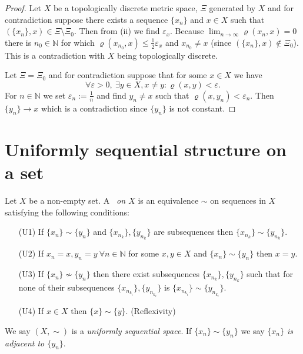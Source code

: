 \begin{proof}
Let $X$ be a topologically discrete metric space, $\Xi$ generated by $X$ and for contradiction suppose there exists a sequence $\{x_n\}$ and $x\in X$ such that $(\{x_n\},x)\in\Xi\setminus\Xi_0$. Then from (ii) we find $\varepsilon_x$. Because $\lim_{n\to\infty}\varrho(x_n,x)=0$ there is $n_0\in\mathbb{N}$ for which $\varrho(x_{n_0},x)\le\frac{1}{2}\varepsilon_x$ and $x_{n_0}\ne x$ (since $(\{x_n\},x)\notin\Xi_0$). This is a contradiction with $X$ being topologically discrete.

Let $\Xi=\Xi_0$ and for contradiction suppose that for some $x\in X$ we have
\[
	\forall \varepsilon>0,\ \exists y\in X, x\ne y: \varrho(x,y)<\varepsilon.
\]
For $n\in \mathbb{N}$ we set $\varepsilon_n:=\frac{1}{n}$ and find $y_n\ne x$ such that $\varrho(x,y_n)<\varepsilon_n$. Then $\{y_n\}\to x$ which is a contradiction since $\{y_n\}$ is not constant.
\end{proof}

\section{Uniformly sequential structure on a set}



\begin{define} \label{def:unistr}
Let $X$ be a non-empty set.  A \emph{\uss\ on $X$} is an equivalence $\sim$ on sequences in $X$ satisfying the following conditions:
\begin{enumerate}
	\item[(U1)] If $\{x_n\} \sim \{y_n\}$ and $\{x_{n_k}\}, \{y_{n_k}\}$ are subsequences then $\{x_{n_k}\} \sim \{y_{n_k}\}$.
	\item[(U2)] If $x_n=x, y_n=y\ \forall n\in \mathbb{N}$ for some $x,y\in X$ and $\{x_n\} \sim \{y_n\}$ then $x=y$.
	\item[(U3)] If $\{x_n\} \not\sim \{y_n\}$ then there exist subsequences $\{x_{n_k}\}, \{y_{n_k}\}$ such that for none of their subsequences $\{x_{n_{k_i}}\}, \{y_{n_{k_i}}\}$ is $\{x_{n_{k_i}}\}\sim \{y_{n_{k_i}}\}$.
	\item[(U4)] If $x\in X$ then $\{x\} \sim \{y\}$. (Reflexivity) 
\end{enumerate}
We say $(X,\sim)$ is a \emph{uniformly sequential space}. If $\{x_n\} \sim\{y_n\}$ we say  \emph{$\{x_n\} $ is adjacent to $\{y_n\}$}.
\end{define}

